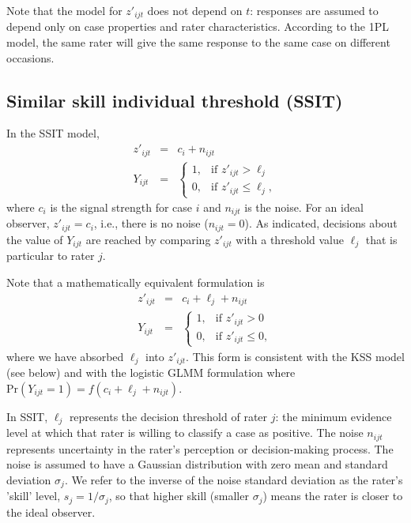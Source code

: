 \documentclass[num-refs]{wiley-article}
\begin{document}
Note that the model for $z'_{ijt}$ does not depend on $t$: responses are assumed to depend only on case properties and rater characteristics. According to the 1PL model, the same rater will give the same response to the same case on different occasions. 

\subsection*{Similar skill individual threshold (SSIT)}\label{section-SSIT}
In the SSIT model,
\begin{eqnarray*}
  z'_{ijt} &=& c_i + n_{ijt} \\
  Y_{ijt}&=&\begin{cases}
    1, & \text{if $z'_{ijt}>\ell_j$}\\
    0, & \text{if $z'_{ijt}\leq \ell_j$},
  \end{cases}
\end{eqnarray*}
where $c_i$ is the signal strength for case $i$ and $n_{ijt}$ is the noise. For an ideal observer, $z'_{ijt} = c_i$, i.e., there is no noise ($n_{ijt}=0$). As indicated, decisions about the value of $Y_{ijt}$ are reached by comparing $z'_{ijt}$ with a threshold value $\ell_j$ that is particular to rater $j$.

Note that a mathematically equivalent formulation is
\begin{eqnarray*}
  z'_{ijt} &=& c_i + \ell_j + n_{ijt} \\
  Y_{ijt}&=&\begin{cases}
    1, & \text{if $z'_{ijt}>0$}\\
    0, & \text{if $z'_{ijt}\leq 0$},
  \end{cases}
\end{eqnarray*}
where we have absorbed $\ell_j$ into $z'_{ijt}$. This form is consistent with the KSS model (see below) and with the logistic GLMM formulation where $\text{Pr}(Y_{ijt}=1) = f(c_i + \ell_j + n_{ijt})$.

In SSIT, $\ell_j$ represents the decision threshold of rater $j$: the minimum evidence level at which that rater is willing to classify a case as positive. The noise $n_{ijt}$ represents uncertainty in the rater's perception or decision-making process. The noise is assumed to have a Gaussian distribution with zero mean and standard deviation $\sigma_j$. We refer to the inverse of the noise standard deviation as the rater's 'skill' level, $s_j = 1/\sigma_j$, so that higher skill (smaller $\sigma_j$) means the rater is closer to the ideal observer.
\end{document}
